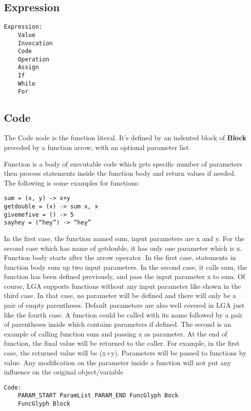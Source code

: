 \documentclass[10pt]{report}
\begin{document}
\subsection{Expression}

\begin{verbatim}
Expression:
    Value
    Invocation
    Code
    Operation
    Assign
    If
    While
    For
\end{verbatim}

\subsection{Code}

The Code node is the function literal. It's defined by an indented block of \textbf{Block} preceded by a function arrow, with an optional parameter list.

Function is a body of executable code which gets specific number of parameters then process statements inside the function body and return values if needed.  The following is some examples for functions:
\begin{verbatim}
sum = (x, y) -> x+y
getdouble = (x) -> sum x, x
givemefive = () -> 5
sayhey = (“hey”) -> “hey”
\end{verbatim}

In the first case, the function named sum, input parameters are x and y. For the second case which has name of getdouble, it has only one parameter which is x. Function body starts after the arrow operator. In the first case, statements in function body sum up two input parameters. In the second case, it calls sum, the function has been defined previously, and pass the input parameter x to sum. Of course, LGA supports functions without any input parameter like shown in the third case. In that case, no parameter will be defined and there will only be a pair of empty parentheses. Default parameters are also well covered in LGA just like the fourth case. 
A function could be called with its name followed by a pair of parentheses inside which contains parameters if defined. The second is an example of calling function sum and passing x as parameter.
At the end of function, the final value will be returned to the caller. For example, in the first case, the returned value will be (x+y). 
Parameters will be passed to functions by value. Any modification on the parameter inside a function will not put any influence on the original object/variable

\begin{verbatim}
Code:
    PARAM_START ParamList PARAM_END FuncGlyph Bock
    FuncGlyph Block
\end{verbatim}
\end{document}
